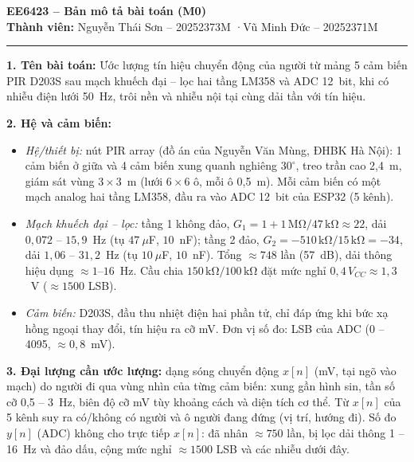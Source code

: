 \documentclass[a4paper,10pt]{article}
\newcommand{\muc}[1]{\par\smallskip\textbf{#1}\enspace}
\newcommand{\kO}{\,\text{kΩ}}
\newcommand{\MO}{\,\text{MΩ}}
\begin{document}
\begin{center}
  {\large\bfseries EE6423 – Bản mô tả bài toán (M0)}\\[2pt]
  \textbf{Thành viên:} Nguyễn Thái Sơn – 20252373M \quad·\quad Vũ Minh Đức – 20252371M
\end{center}
\vspace{-4pt}\rule{\linewidth}{0.4pt}

\muc{1. Tên bài toán:} Ước lượng tín hiệu chuyển động của người từ mảng 5 cảm biến PIR D203S sau mạch
khuếch đại -- lọc hai tầng LM358 và ADC 12~bit, khi có nhiễu điện lưới 50~Hz, trôi nền và nhiễu nội tại
cùng dải tần với tín hiệu.

\muc{2. Hệ và cảm biến:}
\begin{itemize}
  \item \emph{Hệ/thiết bị:} nút PIR array (đồ án của Nguyễn Văn Mùng, ĐHBK Hà Nội): 1 cảm biến ở giữa và 4 cảm biến
        xung quanh nghiêng $30^\circ$, treo trần cao 2,4~m, giám sát vùng $3\times3$~m (lưới $6\times6$ ô, mỗi ô 0,5~m).
        Mỗi cảm biến có một mạch analog hai tầng LM358, đầu ra vào ADC 12~bit của ESP32 (5 kênh).
  \item \emph{Mạch khuếch đại -- lọc:} tầng 1 không đảo, $G_1 = 1 + 1\MO/47\kO \approx 22$, dải $0{,}072$ -- $15{,}9$~Hz
        (tụ $47~\mu$F, $10$~nF); tầng 2 đảo, $G_2 = -510\kO/15\kO = -34$, dải $1{,}06$ -- $31{,}2$~Hz (tụ $10~\mu$F, $10$~nF).
        Tổng $\approx 748$ lần (57~dB), dải thông hiệu dụng $\approx 1$--$16$~Hz. Cầu chia $150\kO/100\kO$ đặt mức nghỉ
        $0{,}4\,V_{CC} \approx 1{,}3$~V ($\approx 1500$ LSB).
  \item \emph{Cảm biến:} D203S, đầu thu nhiệt điện hai phần tử, chỉ đáp ứng khi bức xạ hồng ngoại thay đổi, tín hiệu ra cỡ mV.
        Đơn vị số đo: LSB của ADC (0 -- 4095, $\approx 0{,}8$~mV).
\end{itemize}

\muc{3. Đại lượng cần ước lượng:} dạng sóng chuyển động $x[n]$ (mV, tại ngõ vào mạch) do người đi qua vùng nhìn của
từng cảm biến: xung gần hình sin, tần số cỡ 0,5 -- 3~Hz, biên độ cỡ mV tùy khoảng cách và diện tích cơ thể. Từ $x[n]$ của
5 kênh suy ra có/không có người và ô người đang đứng (vị trí, hướng đi). Số đo $y[n]$ (ADC) không cho trực tiếp $x[n]$:
đã nhân $\approx 750$ lần, bị lọc dải thông 1 -- 16~Hz và đảo dấu, cộng mức nghỉ $\approx 1500$ LSB và các nhiễu dưới đây.
\end{document}

